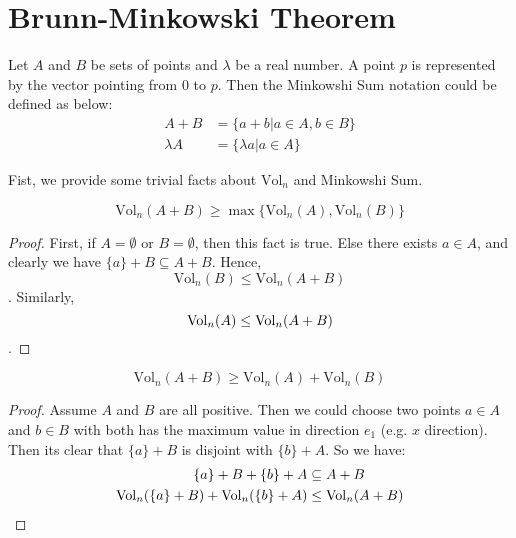 \section{Brunn-Minkowski Theorem}
\begin{define}
  Let $A$ and $B$ be sets of points and $\lambda$ be a real number. A point $p$ is represented by the vector pointing from $0$ to $p$. Then the Minkowshi Sum notation could be defined as below:
  \begin{align*}
    A + B &= \{a + b| a\in A, b\in B\} \\
    \lambda A &= \{\lambda a | a\in A\}
  \end{align*}
\end{define}
Fist, we provide some trivial facts about $\mathrm{Vol}_n$ and Minkowshi Sum.
\begin{fact}
  \[
    \mathrm{Vol}_n (A + B) \geq \max\{\mathrm{Vol}_n(A), \mathrm{Vol}_n(B)\}
  \]
\end{fact}
\begin{proof}
  First, if $A = \emptyset$ or $B = \emptyset$, then this fact is true. Else there exists $a\in A$, and clearly we have $\{a\} + B \subseteq A + B$. Hence,
  \[\mathrm{Vol}_n(B)\leq \mathrm{Vol}_n(A+B)\]
  . Similarly,
  \[\mathrm{Vol}_n(A) \leq \mathrm{Vol}_n (A + B) \qedhere\].
\end{proof}
\begin{fact}
  \[
    \mathrm{Vol}_n(A + B) \geq \mathrm{Vol}_n(A) + \mathrm{Vol}_n(B)
  \]
\end{fact}
\begin{proof}
  Assume $A$ and $B$ are all positive. Then we could choose two points $a\in A$ and $b\in B$ with both has the maximum value in direction $e_1$ (e.g. $x$ direction). Then its clear that $\{a\} + B$ is disjoint with $\{b\} + A$. So we have:
  \begin{align*}
    \{a\} + B + \{b\} + A &\subseteq A + B \\
    \mathrm{Vol}_n(\{a\} + B) + \mathrm{Vol}_n(\{b\} + A) &\leq \mathrm{Vol}_n(A + B) \qedhere
  \end{align*}
\end{proof}
